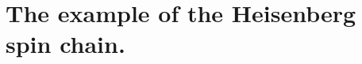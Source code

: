 \documentclass[12pt]{article}
\begin{document}
\section{The example of the Heisenberg spin chain.}




\end{document}
